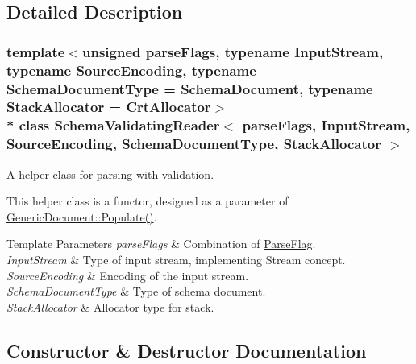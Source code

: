 \subsection{Detailed Description}
\subsubsection*{template$<$unsigned parse\+Flags, typename Input\+Stream, typename Source\+Encoding, typename Schema\+Document\+Type = Schema\+Document, typename Stack\+Allocator = Crt\+Allocator$>$\\*
class Schema\+Validating\+Reader$<$ parse\+Flags, Input\+Stream, Source\+Encoding, Schema\+Document\+Type, Stack\+Allocator $>$}

A helper class for parsing with validation. 

This helper class is a functor, designed as a parameter of \hyperlink{classGenericDocument_a36fbc7d0a9595d26e0d2c8859d207d1f}{Generic\+Document\+::\+Populate()}.


\begin{DoxyTemplParams}{Template Parameters}
{\em parse\+Flags} & Combination of \hyperlink{reader_8h_ab7be7dabe6ffcba60fad441505583450}{Parse\+Flag}. \\
\hline
{\em Input\+Stream} & Type of input stream, implementing Stream concept. \\
\hline
{\em Source\+Encoding} & Encoding of the input stream. \\
\hline
{\em Schema\+Document\+Type} & Type of schema document. \\
\hline
{\em Stack\+Allocator} & Allocator type for stack. \\
\hline
\end{DoxyTemplParams}


\subsection{Constructor \& Destructor Documentation}
